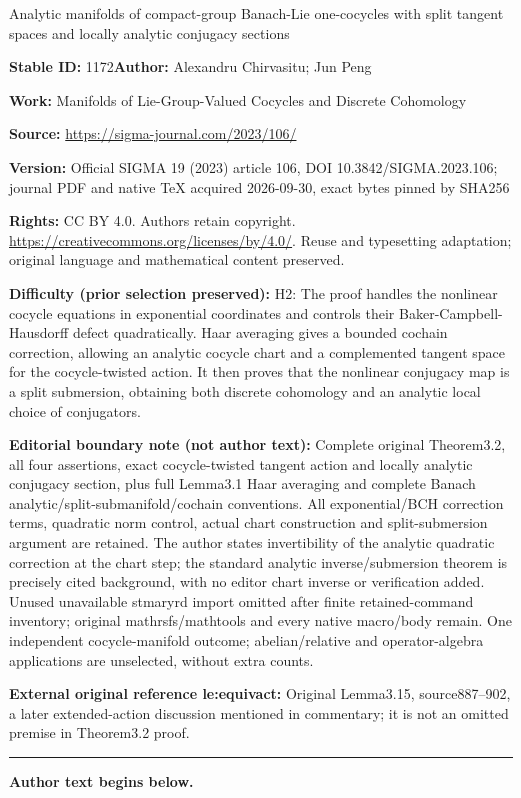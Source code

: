\documentclass[11pt]{article}
\numberwithin{equation}{section}
\numberwithin{equation}{section}
\begin{document}
\begin{center}\Large Analytic manifolds of compact-group Banach-Lie one-cocycles with split tangent spaces and locally analytic conjugacy sections\end{center}
\noindent\textbf{Stable ID:} 1172\quad\textbf{Author:} Alexandru Chirvasitu; Jun Peng\par
\noindent\textbf{Work:} Manifolds of Lie-Group-Valued Cocycles and Discrete Cohomology\par
\noindent\textbf{Source:} \url{https://sigma-journal.com/2023/106/}\par
\noindent\textbf{Version:} Official SIGMA 19 (2023) article 106, DOI 10.3842/SIGMA.2023.106; journal PDF and native TeX acquired 2026-09-30, exact bytes pinned by SHA256\par
\noindent\textbf{Rights:} CC BY 4.0. Authors retain copyright. \url{https://creativecommons.org/licenses/by/4.0/}. Reuse and typesetting adaptation; original language and mathematical content preserved.\par
\noindent\textbf{Difficulty (prior selection preserved):} {\CJKfont H2: The proof handles the nonlinear cocycle equations in exponential coordinates and controls their Baker-Campbell-Hausdorff defect quadratically. Haar averaging gives a bounded cochain correction, allowing an analytic cocycle chart and a complemented tangent space for the cocycle-twisted action. It then proves that the nonlinear conjugacy map is a split submersion, obtaining both discrete cohomology and an analytic local choice of conjugators.}\par
\medskip\noindent\textbf{Editorial boundary note (not author text):} Complete original Theorem3.2, all four assertions, exact cocycle-twisted tangent action and locally analytic conjugacy section, plus full Lemma3.1 Haar averaging and complete Banach analytic/split-submanifold/cochain conventions. All exponential/BCH correction terms, quadratic norm control, actual chart construction and split-submersion argument are retained. The author states invertibility of the analytic quadratic correction at the chart step; the standard analytic inverse/submersion theorem is precisely cited background, with no editor chart inverse or verification added. Unused unavailable stmaryrd import omitted after finite retained-command inventory; original mathrsfs/mathtools and every native macro/body remain. One independent cocycle-manifold outcome; abelian/relative and operator-algebra applications are unselected, without extra counts.\par
\noindent\textbf{External original reference le:equivact:} Original Lemma3.15, source887–902, a later extended-action discussion mentioned in commentary; it is not an omitted premise in Theorem3.2 proof.\par
\medskip\hrule\medskip\noindent\textbf{Author text begins below.}\par
\setcounter{section}{2}\setcounter{subsection}{0}\setcounter{Theorem}{1}
\end{document}
